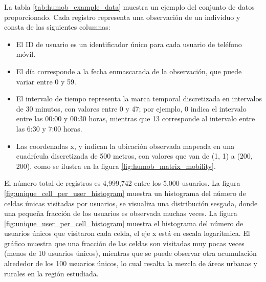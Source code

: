 La tabla \ref{tab:humob_example_data} muestra un ejemplo del conjunto de datos proporcionado. Cada registro representa una observación de un individuo y consta de las siguientes columnas:

\begin{itemize}
    \item El ID de usuario es un identificador único para cada usuario de teléfono móvil.
    \item El día corresponde a la fecha enmascarada de la observación, que puede variar entre 0 y 59.
    \item El intervalo de tiempo representa la marca temporal discretizada en intervalos de 30 minutos, con valores entre 0 y 47; por ejemplo, 0 indica el intervalo entre las 00:00 y 00:30 horas, mientras que 13 corresponde al intervalo entre las 6:30 y 7:00 horas.
    \item Las coordenadas x, y indican la ubicación observada mapeada en una cuadrícula discretizada de 500 metros, con valores que van de (1, 1) a (200, 200), como se ilustra en la figura \ref{fig:humob_matrix_mobility}.
\end{itemize}

El número total de registros es 4,999,742 entre los 5,000 usuarios. La figura \ref{fig:unique_cell_per_user_histogram} muestra un histograma del número de celdas únicas visitadas por usuarios, se visualiza una distribución sesgada, donde una pequeña fracción de los usuarios es observada muchas veces. La figura \ref{fig:unique_user_per_cell_histogram} muestra el histograma del número de usuarios únicos que visitaron cada celda, el eje x está en escala logarítmica. El gráfico muestra que una fracción de las celdas son visitadas muy pocas veces (menos de 10 usuarios únicos), mientras que se puede observar otra acumulación alrededor de los 100 usuarios únicos, lo cual resalta la mezcla de áreas urbanas y rurales en la región estudiada.


